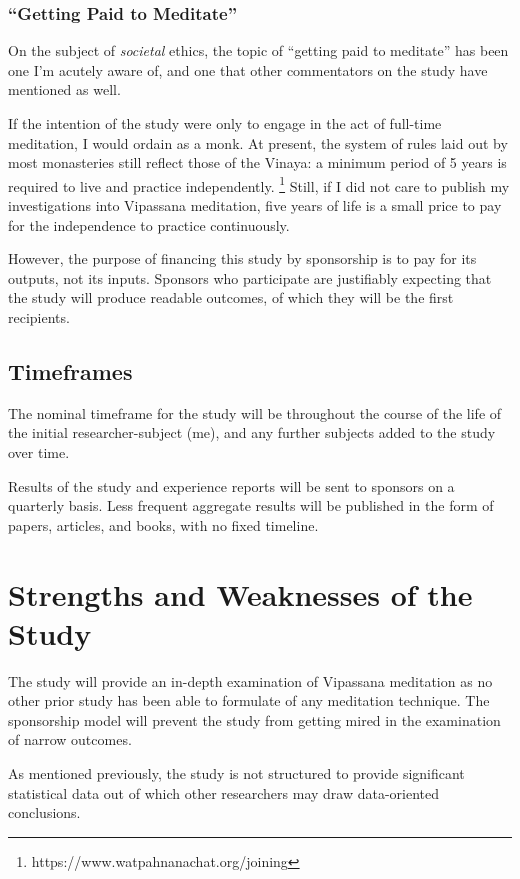 \documentclass[a4paper, amsfonts, amssymb, amsmath, reprint, showkeys, nofootinbib, twoside]{revtex4-1}
\begin{document}
\subsubsection{``Getting Paid to Meditate''}

On the subject of \textit{societal} ethics, the topic of
``getting paid to meditate'' has been one I'm acutely aware of, and one
that other commentators on the study have mentioned as well.

If the intention of the study were only to engage in the act of full-time
meditation, I would ordain as a monk.
At present, the system of rules laid out by most monasteries still reflect
those of the Vinaya: a minimum period of 5 years is required to live and
practice independently.
\footnote{https://www.watpahnanachat.org/joining}
Still, if I did not care to publish my investigations into Vipassana
meditation, five years of life is a small price to pay for the
independence to practice continuously.
\cite{nanatusita2014patimokkha}

However, the purpose of financing this study by sponsorship is to pay for
its outputs, not its inputs.
Sponsors who participate are justifiably expecting that the study will
produce readable outcomes, of which they will be the first recipients.

\subsection{Timeframes}

The nominal timeframe for the study will be throughout the course of the
life of the initial researcher-subject (me), and any further subjects
added to the study over time.

Results of the study and experience reports will be sent to sponsors
on a quarterly basis.
Less frequent aggregate results will be published in the form of
papers, articles, and books, with no fixed timeline.

\section{Strengths and Weaknesses of the Study}

The study will provide an in-depth examination of Vipassana meditation
as no other prior study has been able to formulate of any meditation
technique.
The sponsorship model will prevent the study from getting mired in
the examination of narrow outcomes.

As mentioned previously, the study is not structured to provide
significant statistical data out of which other researchers may draw
data-oriented conclusions.
\end{document}
